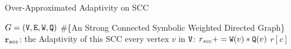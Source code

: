         \begin{algorithm}
          \caption{
          {Over-Approximated Adaptivity on SCC}
          \label{alg:overadp_alg}
          }
          \begin{algorithmic}[1]
          \REQUIRE $G = (\mathtt{V}, \mathtt{E}, \mathtt{W}, \mathtt{Q})$ \#\{An Strong Connected Symbolic Weighted Directed Graph\}
          \\
          $\mathtt{r_{scc}}$: the Adaptivity of this SCC
           every vertex $v$ in $\mathtt{V}$:
          \STATE  \qquad $r_{scc} += \mathtt{W}(v)*\mathtt{Q}(v)$  
          \RETURN $r[c]$
          \end{algorithmic}
          \end{algorithm}
